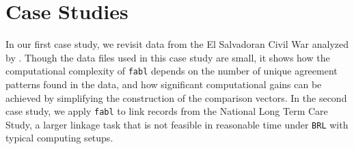 \documentclass[ba]{imsart}
\begin{document}
	
	\section{Case Studies}
	\label{sec:case-studies}
	
	In our first case study, we revisit data from the El Salvadoran Civil War analyzed by \cite{sadinle_bayesian_2017}. Though the data files used in this case study are small, it shows how the computational complexity of \texttt{fabl} depends on the number of unique agreement patterns found in the data, and how significant computational gains can be achieved by simplifying the construction of the comparison vectors. In the second case study, we apply \texttt{fabl} to link records from the National Long Term Care Study, a larger linkage task that is not feasible in reasonable time under \texttt{BRL} with typical computing setups. 
	
\end{document}
